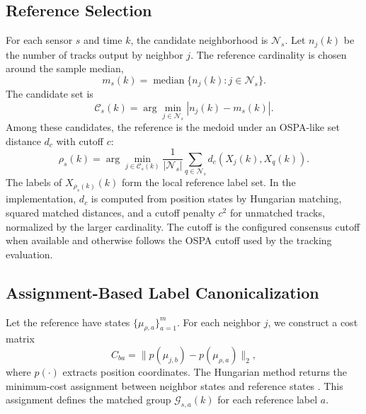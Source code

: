 \documentclass{IEEEtaes}
\begin{document}
\subsection{Reference Selection}
For each sensor $s$ and time $k$, the candidate neighborhood is $\mathcal{N}_s$. Let $n_j(k)$ be the number of tracks output by neighbor $j$. The reference cardinality is chosen around the sample median,
\begin{equation}
  m_s(k)=\operatorname{median}\{n_j(k):j\in\mathcal{N}_s\}.
\end{equation}
The candidate set is
\begin{equation}
  \mathcal{C}_s(k)=\arg\min_{j\in\mathcal{N}_s}|n_j(k)-m_s(k)|.
\end{equation}
Among these candidates, the reference is the medoid under an OSPA-like set distance $d_c$ with cutoff $c$:
\begin{equation}
  \rho_s(k)=\arg\min_{j\in\mathcal{C}_s(k)}
  \frac{1}{|\mathcal{N}_s|}\sum_{q\in\mathcal{N}_s}d_c(X_j(k),X_q(k)).
\end{equation}
The labels of $X_{\rho_s(k)}(k)$ form the local reference label set.
In the implementation, $d_c$ is computed from position states by Hungarian matching, squared matched distances, and a cutoff penalty $c^2$ for unmatched tracks, normalized by the larger cardinality. The cutoff is the configured consensus cutoff when available and otherwise follows the OSPA cutoff used by the tracking evaluation.

\subsection{Assignment-Based Label Canonicalization}
Let the reference have states $\{\mu_{\rho,a}\}_{a=1}^{m}$. For each neighbor $j$, we construct a cost matrix
\begin{equation}
  C_{ba}=\|p(\mu_{j,b})-p(\mu_{\rho,a})\|_2,
\end{equation}
where $p(\cdot)$ extracts position coordinates. The Hungarian method returns the minimum-cost assignment between neighbor states and reference states \cite{Kuhn1955Hungarian}. This assignment defines the matched group $\mathcal{G}_{s,a}(k)$ for each reference label $a$.
\end{document}
